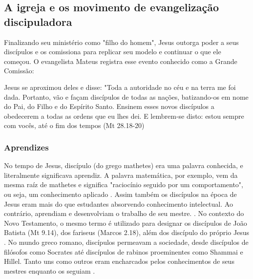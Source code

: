 \documentclass[
	12pt,				%
	openright,			%
	twoside,			%
	a4paper,			%
	english,			%
	french,				%
	spanish,			%
	brazil				%
	]{abntex2}
\begin{document}
\subsection{A igreja e os movimento de evangelização discipuladora}

Finalizando seu ministério como "filho do homem", Jesus outorga poder a seus discípulos e os comissiona para replicar seu modelo e continuar o que ele começou. O evangelista Mateus registra esse evento conhecido como a Grande Comissão: 

\begin{citacao}
Jesus se aproximou deles e disse: "Toda a autoridade no céu e na terra me foi dada. Portanto, vão e façam discípulos de todas as nações, batizando-os em nome do Pai, do Filho e do Espírito Santo. Ensinem esses novos discípulos a obedecerem a todas as ordens que eu lhes dei. E lembrem-se disto: estou sempre com vocês, até o fim dos tempos (Mt 28.18-20)
\end{citacao}

\subsubsection{Aprendizes}

No tempo de Jesus, discípulo (do grego mathetes) era uma palavra conhecida, e literalmente significava aprendiz. A palavra matemática, por exemplo, vem da mesma raíz de mathetes e significa "raciocínio seguido por um comportamento", ou seja, um conhecimento aplicado \cite[15]{gtsm}. Assim também os discípulos na época de Jesus eram mais do que estudantes absorvendo conhecimento intelectual. Ao contrário, aprendiam e desenvolviam o trabalho de seu mestre. \cite[15]{gtsm}. No contexto do Novo Testamento, o mesmo termo é utilizado para designar os discípulos de João Batista (Mt 9.14), dos fariseus (Marcos 2.18), além dos discípulo do próprio Jesus \cite[59]{brandao}. No mundo greco romano, discípulos permeavam a sociedade, desde discípulos de filósofos como Socrates até discípulos de rabinos proeminentes como Shammai e Hillel. Tanto uns como outros eram encharcados pelos conhecimentos de seus mestres enquanto os seguiam \cite[209]{shirley}.
\end{document}
